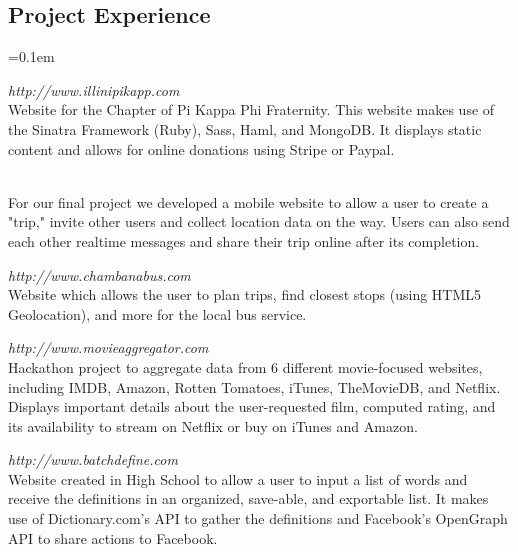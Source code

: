 \documentclass[10pt,letterpaper]{article}
\begin{document}
\subsection*{Project Experience}
\begin{description}[leftmargin=0pt]
	\parskip=0.1em
      
      \item[Pi Kappa Phi Illinois Chapter] {\emph{http://www.illinipikapp.com}}\hfill\\
      Website for the Chapter of Pi Kappa Phi Fraternity. This website makes use of the
      Sinatra Framework (Ruby), Sass, Haml, and MongoDB. It displays static 
      content and allows for online donations using Stripe or Paypal.
      
      \item[CS 498STK Final Project]\hfill\\
      For our final project we developed a mobile website to allow a user to 
      create a "trip," invite other users and collect location data on the way. 
      Users can also send each other realtime messages and share their 
      trip online after its completion.
      
	\item[Chambana Bus] {\emph{http://www.chambanabus.com}}\hfill\\
      Website which allows the user to plan trips, find closest stops (using HTML5 
	Geolocation), and more for the local bus service.

	\item[MovieAggregator] {\emph{http://www.movieaggregator.com}}\hfill\\
      Hackathon project to aggregate data from 6 different movie-focused 
      websites, including IMDB, Amazon, Rotten Tomatoes, iTunes, TheMovieDB, and 
      Netflix. Displays important details about the user-requested film, 
      computed rating, and its availability to stream on Netflix or buy on 
      iTunes and Amazon.

	\item[BatchDefine] {\emph{http://www.batchdefine.com}}\hfill\\
      Website created in High School to allow a user to input a list of words 
      and receive the definitions in an organized, save-able, and exportable list. 
      It makes use of Dictionary.com's API to gather the definitions and 
      Facebook's OpenGraph API to share actions to Facebook.

	
\end{description}
\end{document}

